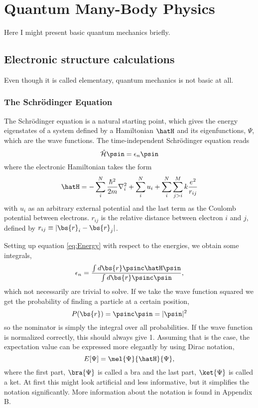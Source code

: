 \chapter{Quantum Many-Body Physics} \label{sec:quantum}
Here I might present basic quantum mechanics briefly.

\section{Electronic structure calculations} \label{subsec:elementary}
Even though it is called elementary, quantum mechanics is not basic at all. 

\subsection{The Schrödinger Equation} \label{subsubsec:schrodinger}
The Schrödinger equation is a natural starting point, which gives the energy eigenstates of a system defined by a Hamiltonian $\hatH$ and its eigenfunctions, $\Psi$, which are the wave functions. The time-independent Schrödinger equation reads
\begin{equation}
\label{eq:Energy}
 \hat{\mathcal{H}}\psin=\epsilon_n\psin
\end{equation}
where the electronic Hamiltonian takes the form
\begin{equation}
\hatH=-\sum_i^N\frac{\hbar^2}{2m}\nabla_i^2+\sum_i^Nu_i + \sum_i^N\sum_{j>i}^Mk\frac{e^2}{r_{ij}}
\end{equation}
with $u_i$ as an arbitrary external potential and the last term as the Coulomb potential between electrons. $r_{ij}$ is the relative distance between electron $i$ and $j$, defined by $r_{ij}\equiv|\bs{r}_i-\bs{r}_j|$.

Setting up equation \eqref{eq:Energy} with respect to the energies, we obtain some integrals,
\begin{equation}
\epsilon_n=\frac{\int d\bs{r}\psinc\hatH\psin}{\int d\bs{r}\psinc\psin},
\end{equation}
which not necessarily are trivial to solve. If we take the wave function squared we get the probability of finding a particle at a certain position,
\begin{equation}
P(\bs{r})=\psinc\psin=|\psin|^2
\end{equation}
so the nominator is simply the integral over all probabilities. If the wave function is normalized correctly, this should always give 1. Assuming that is the case, the expectation value can be expressed more elegantly by using Dirac notation,
\begin{equation}
E[\Psi]=\mel{\Psi}{\hatH}{\Psi},
\end{equation}
where the first part, $\bra{\Psi}$ is called a bra and the last part, $\ket{\Psi}$ is called a ket. At first this might look artificial and less informative, but it simplifies the notation significantly. More information about the notation is found in Appendix B. 


